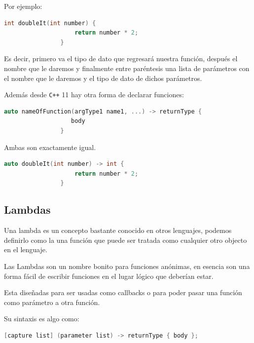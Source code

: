 \documentclass[12pt, fleqn]{report}                             %
\theoremstyle{break}                                            %
\newcommand{\textCode}[1]  { \texttt{#1} }                      %
\newcommand \Cpp  {\textCode{C++} }                               %
\begin{document}
            Por ejemplo:
            \begin{lstlisting}[language=C++, gobble=16]
                int doubleIt(int number) {
                    return number * 2;
                }
            \end{lstlisting}

            Es decir, primero va el tipo de dato que regresará nuestra función, después el nombre que le
            daremos y finalmente entre paréntesis una lista de parámetros con el nombre que le daremos y el
            tipo de dato de dichos parámetros.

            Además desde \Cpp 11 hay otra forma de declarar funciones:
            \begin{lstlisting}[language=C++, gobble=16]
                auto nameOfFunction(argType1 name1, ...) -> returnType {
                   body
                }
            \end{lstlisting}

            Ambas son exactamente igual.
            \begin{lstlisting}[language=C++, gobble=16]
                auto doubleIt(int number) -> int {
                    return number * 2;
                }
            \end{lstlisting}

            
            \clearpage
            \subsection{Lambdas}

                Una lambda es un concepto bastante conocido en otros lenguajes, podemos definirlo como 
                la una función que puede ser tratada como cualquier otro objecto en el lenguaje.

                Las Lambdas son un nombre bonito para funciones anónimas, en esencia son una forma fácil
                de escribir funciones en el lugar lógico que deberían estar.

                Esta diseñadas para ser usadas como callbacks o para poder pasar una función como parámetro
                a otra función.

                Su sintaxis es algo como:
                \begin{lstlisting}[language=C++, gobble=20]
                    [capture list] (parameter list) -> returnType { body };
                \end{lstlisting} 
\end{document}
